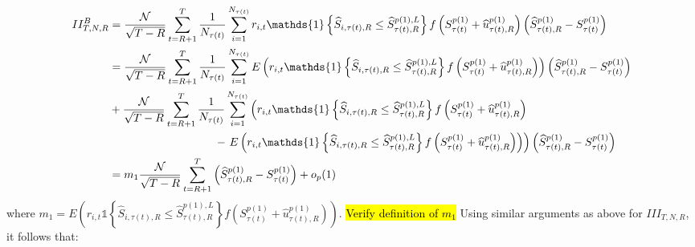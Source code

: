 \begin{align*}
    II_{T,N,R}^B &= \frac{\mathcal{N}}{\sqrt{T-R}}\sum_{t=R+1}^{T} \frac{1}{N_{\tau(t)}}\sum_{i=1}^{N_{\tau(t)}} r_{i,t} \mathds{1} \left\{ \widehat{S}_{i,\tau(t),R}\leq \widehat{S}_{\tau(t),R}^{p(1),L}\right\} f \left( S_{\tau(t)}^{p(1)}+\widehat{u}_{\tau(t),R}^{p(1)} \right) \left( \widehat{S}_{\tau(t),R}^{p(1)} - S_{\tau(t)}^{p(1)} \right)\\
    &= \frac{\mathcal{N}}{\sqrt{T-R}}\sum_{t=R+1}^{T} \frac{1}{N_{\tau(t)}}\sum_{i=1}^{N_{\tau(t)}} E \left( r_{i,t} \mathds{1} \left\{ \widehat{S}_{i,\tau(t),R}\leq \widehat{S}_{\tau(t),R}^{p(1),L}\right\} f \left( S_{\tau(t)}^{p(1)}+\widehat{u}_{\tau(t),R}^{p(1)} \right) \right) \left( \widehat{S}_{\tau(t),R}^{p(1)} - S_{\tau(t)}^{p(1)} \right) \\
    &+ \frac{\mathcal{N}}{\sqrt{T-R}}\sum_{t=R+1}^{T} \frac{1}{N_{\tau(t)}}\sum_{i=1}^{N_{\tau(t)}} \left( r_{i,t} \mathds{1} \left\{ \widehat{S}_{i,\tau(t),R}\leq \widehat{S}_{\tau(t),R}^{p(1),L}\right\} f \left( S_{\tau(t)}^{p(1)}+\widehat{u}_{\tau(t),R}^{p(1)} \right) \right. \\
    &\hspace{3.3cm}- \left. E \left( r_{i,t} \mathds{1} \left\{ \widehat{S}_{i,\tau(t),R}\leq \widehat{S}_{\tau(t),R}^{p(1),L}\right\} f \left( S_{\tau(t)}^{p(1)}+\widehat{u}_{\tau(t),R}^{p(1)} \right) \right) \right) \left( \widehat{S}_{\tau(t),R}^{p(1)} - S_{\tau(t)}^{p(1)} \right) \\
    &= m_{1}\frac{\mathcal{N}}{\sqrt{T-R}}\sum_{t=R+1}^{T}\left( \widehat{S}_{\tau(t),R}^{p(1)}-S_{\tau(t)}^{p(1)}\right) + o_p(1)
\end{align*}
where $m_1 = E \left( r_{i,t} \mathds{1} \left\{ \widehat{S}_{i,\tau(t),R}\leq \widehat{S}_{\tau(t),R}^{p(1),L}\right\} f \left( S_{\tau(t)}^{p(1)}+\widehat{u}_{\tau(t),R}^{p(1)} \right) \right)$. \hl{Verify definition of $m_1$}
Using similar arguments as above for $III_{T,N,R}$, it follows that:
